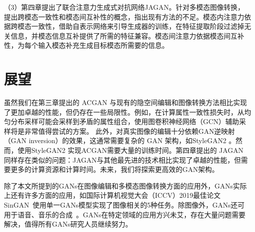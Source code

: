 （3）第四章提出了联合注意力生成式对抗网络JAGAN。针对多模态图像转换，提出跨模态一致性和模态间互补性的概念，指出现有方法的不足。模态内注意力依据跨模态一致性，借助自表示网络来引导生成器的训练，在特征提取阶段过滤掉无关信息，并模态信息互补提供了所需的特征兼容。模态间注意力依据模态间互补性，为每个输入模态补充生成目标模态所需要的信息。

\section{展望}

虽然我们在第三章提出的 ACGAN 与现有的隐空间编辑和图像转换方法相比实现了更加卓越的性能，但仍存在一些局限性。例如，在计算属性一致性损失时，从均匀分布采样可能会采样到矛盾的属性组合，使用图卷积神经网络（GCN）辅助采样将是非常值得尝试的方案。 此外，对真实图像的编辑十分依赖GAN逆映射（GAN inversion）的效果，这通常需要复杂的 GAN 架构，如StyleGAN2 。然而，使用StyleGAN2 实现ACGAN需要大量的训练时间。第四章提出的 JAGAN 同样存在类似的问题：JAGAN与其他最先进的技术相比实现了卓越的性能，但需要更多的计算资源和计算时间。未来，我们将探索更高效的GAN架构。

除了本文所提到的GANs在图像编辑和多模态图像转换方面的应用外，GANs实际上还有许多方面的应用，如国际计算机视觉大会（ICCV）2019最佳论文SinGAN~\cite{singan}使用单一GANs模型实现了图像相关的5种任务。除图像外，GANs还可用于语音、音乐的合成~\cite{voice1,voice2,voice3}。GANs在特定领域的应用方兴未艾，存在大量问题需要解决，值得所有GANs研究人员继续努力。